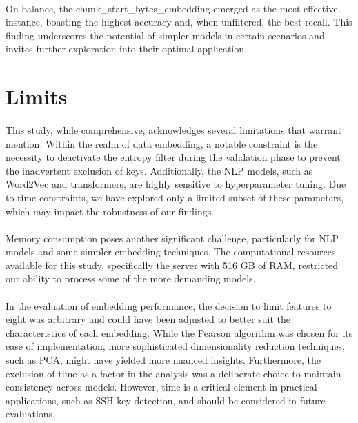 \paragraph{}On balance, the chunk\_start\_bytes\_embedding emerged as the most effective instance, boasting the highest accuracy and, when unfiltered, the best recall. This finding underscores the potential of simpler models in certain scenarios and invites further exploration into their optimal application.


\section{Limits}\label{seq:discussion:limits}

\paragraph{}This study, while comprehensive, acknowledges several limitations that warrant mention. Within the realm of data embedding, a notable constraint is the necessity to deactivate the entropy filter during the validation phase to prevent the inadvertent exclusion of keys. Additionally, the NLP models, such as Word2Vec and transformers, are highly sensitive to hyperparameter tuning. Due to time constraints, we have explored only a limited subset of these parameters, which may impact the robustness of our findings.

\paragraph{}Memory consumption poses another significant challenge, particularly for NLP models and some simpler embedding techniques. The computational resources available for this study, specifically the server with 516 GB of RAM, restricted our ability to process some of the more demanding models.

\paragraph{}In the evaluation of embedding performance, the decision to limit features to eight was arbitrary and could have been adjusted to better suit the characteristics of each embedding. While the Pearson algorithm was chosen for its ease of implementation, more sophisticated dimensionality reduction techniques, such as PCA, might have yielded more nuanced insights. Furthermore, the exclusion of time as a factor in the analysis was a deliberate choice to maintain consistency across models. However, time is a critical element in practical applications, such as SSH key detection, and should be considered in future evaluations.

